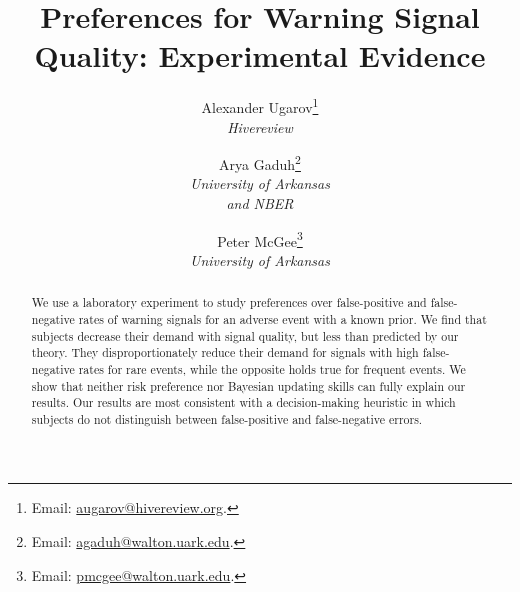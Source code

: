 \documentclass[12pt,a4paper]{article}
\title{\Large Preferences for Warning Signal Quality: Experimental Evidence\\}
\author{Alexander Ugarov\thanks{Email: \href{mailto:augarov@hivereview.org}{augarov@hivereview.org}.} \\
{\small \textit{Hivereview}}
\and Arya Gaduh\thanks{Email: \href{mailto:agaduh@walton.uark.edu}{agaduh@walton.uark.edu}.} \\
{\small \textit{University of Arkansas}}\\
{\small \textit{and NBER}} 
\and Peter McGee\thanks{Email: \href{mailto:pmcgee@walton.uark.edu}{pmcgee@walton.uark.edu}.} \\
{\small \textit{University of Arkansas}} 
}
\begin{document}
\maketitle
\onehalfspacing
\begin{abstract}{
\noindent We use a laboratory experiment to study preferences over false-positive and false-negative rates of warning signals for an adverse event with a known prior. We find that subjects decrease their demand with signal quality, but less than predicted by our theory. They disproportionately reduce their demand for signals with high false-negative rates for rare events, while the opposite holds true for frequent events. We show that neither risk preference nor Bayesian updating skills can fully explain our results. Our results are most consistent with a decision-making heuristic in which subjects do not distinguish between false-positive and false-negative errors. 

}


\vspace{10pt}
\begin{singlespace}

\end{singlespace}
\end{abstract}
\end{document}
